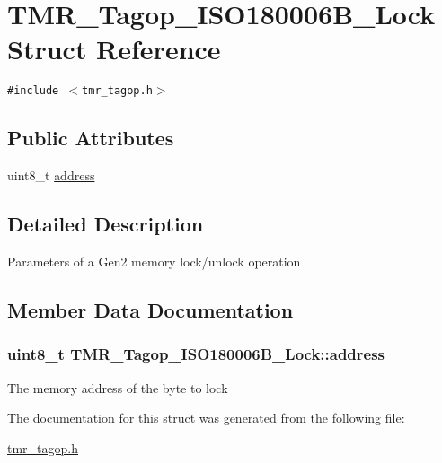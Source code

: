 \hypertarget{struct_t_m_r___tagop___i_s_o180006_b___lock}{
\section{TMR\_\-Tagop\_\-ISO180006B\_\-Lock Struct Reference}
\label{struct_t_m_r___tagop___i_s_o180006_b___lock}
}
{\tt \#include $<$tmr\_\-tagop.h$>$}

\subsection*{Public Attributes}
\begin{CompactItemize}
\item 
uint8\_\-t \hyperlink{struct_t_m_r___tagop___i_s_o180006_b___lock_ea7acbe14d7f7d0c41de251a6a79b028}{address}
\end{CompactItemize}


\subsection{Detailed Description}
Parameters of a Gen2 memory lock/unlock operation 

\subsection{Member Data Documentation}
\hypertarget{struct_t_m_r___tagop___i_s_o180006_b___lock_ea7acbe14d7f7d0c41de251a6a79b028}{
\subsubsection[{address}]{\setlength{\rightskip}{0pt plus 5cm}uint8\_\-t {\bf TMR\_\-Tagop\_\-ISO180006B\_\-Lock::address}}}
\label{struct_t_m_r___tagop___i_s_o180006_b___lock_ea7acbe14d7f7d0c41de251a6a79b028}


The memory address of the byte to lock 

The documentation for this struct was generated from the following file:\begin{CompactItemize}
\item 
\hyperlink{tmr__tagop_8h}{tmr\_\-tagop.h}\end{CompactItemize}

